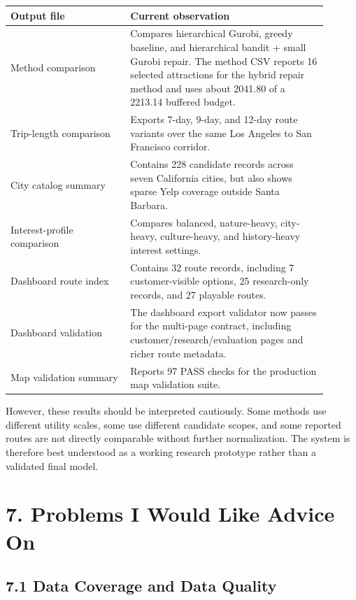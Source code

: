 \documentclass[11pt,a4paper]{article}
\begin{document}
\begin{center}
\begin{tabular}{p{0.34\linewidth} p{0.56\linewidth}}
\hline
\textbf{Output file} & \textbf{Current observation} \\
\hline
Method comparison & Compares hierarchical Gurobi, greedy baseline, and hierarchical bandit + small Gurobi repair. The method CSV reports 16 selected attractions for the hybrid repair method and uses about 2041.80 of a 2213.14 buffered budget. \\
Trip-length comparison & Exports 7-day, 9-day, and 12-day route variants over the same Los Angeles to San Francisco corridor. \\
City catalog summary & Contains 228 candidate records across seven California cities, but also shows sparse Yelp coverage outside Santa Barbara. \\
Interest-profile comparison & Compares balanced, nature-heavy, city-heavy, culture-heavy, and history-heavy interest settings. \\
Dashboard route index & Contains 32 route records, including 7 customer-visible options, 25 research-only records, and 27 playable routes. \\
Dashboard validation & The dashboard export validator now passes for the multi-page contract, including customer/research/evaluation pages and richer route metadata. \\
Map validation summary & Reports 97 PASS checks for the production map validation suite. \\
\hline
\end{tabular}
\end{center}

\vspace{0.5em}
\noindent However, these results should be interpreted cautiously. Some methods use different utility scales, some use different candidate scopes, and some reported routes are not directly comparable without further normalization. The system is therefore best understood as a working research prototype rather than a validated final model.

\section*{7. Problems I Would Like Advice On}

\subsection*{7.1 Data Coverage and Data Quality}
\end{document}

